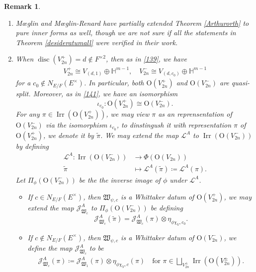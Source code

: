 \documentclass[article]{article}
\numberwithin{equation}{section}
\newtheorem{remark}[theorem]{Remark}
\theoremstyle{definition}
\DeclareMathOperator{\Irr}{Irr}
\DeclareMathOperator{\disc}{disc}
\begin{document}
\begin{remark}
\begin{enumerate}
	\item M\oe glin \cite[\S 1.4 Theorem 1.4.1]{MR2767522} and M\oe glin-Renard \cite{MR3839702} have partially extended Theorem \ref{Arthurorth} to pure inner forms as well, though we are not sure if all the statements in Theorem \ref{desideratumall} were verified in their work.
	\item When $\disc(V_{2n}^+)=d\notin F^{\times 2}$, then as in \ref{139}, we have 
	\begin{align*}
	V_{2n}^+\cong V_{(d,1)}\oplus \mathbb H^{m-1},\quad 
	V_{2n}^-\cong V_{(d,c_0)}\oplus \mathbb H^{m-1} 
	\end{align*} 
	for a $c_0\notin N_{E/F}(E^\times)$. In particular, both $\mathrm O(V_{2n}^+)$ and $\mathrm O(V_{2n}^-)$ are quasi-split. Moreover, as in \ref{141}, we have an isomorphism  $$\iota_{c_0}: \mathrm O(V_{2n}^+)\cong \mathrm O(V_{2n}^{-}).$$
	For any $\pi\in \Irr(\mathrm O(V_{2n}^+))$, we may view $\pi$ as an reprensentation of $\mathrm O(V_{2n}^-)$ via the isomorphism $\iota_{c_0}$, to dinstingush it with representation $\pi$ of $\mathrm O(V_{2n}^+)$, we denote it by $\widetilde{\pi}$. We may extend the map $\mathcal L^A$ to $\Irr\left(\mathrm O(V_{2n}^{-})\right)$ by defining 
	\begin{align*}
	\mathcal L^A: \Irr\left(\mathrm O(V_{2n}^{-})\right)&\longrightarrow \Phi(\mathrm O(V_{2n}))\\
	\widetilde{\pi}&\mapsto\mathcal L^A(\widetilde{\pi})\coloneqq \mathcal L^A(\pi). 
	\end{align*}
	Let $\Pi_{\phi}(\mathrm O(V_{2n}^-))$ be the the inverse image of $\phi$ under $\mathcal L^A$. 
	\begin{itemize}
		\item If $c\in N_{E/F}(E^\times)$, then $\mathfrak W_{\psi,c}$ is a Whittaker datum of $\mathrm O(V_{2n}^+)$, we may extend the map $\mathcal J_{\mathfrak W_{c}}^A$ to $\Pi_{\phi}(\mathrm O(V_{2n}^-))$ be defining 
		$$\mathcal J_{\mathfrak W_{c}}^A(\widetilde{\pi})= \mathcal J_{\mathfrak W_{c}}^A(\pi)\otimes \eta_{\phi\chi_{V},c_0}.$$
		\item If $c\notin N_{E/F}(E^\times)$, then $\mathfrak W_{\psi,c}$ is a Whittaker datum of $\mathrm O(V_{2n}^-)$, we define the map $\mathcal J_{\mathfrak W_{c}}^A$ to be 
		\begin{align*}
		\mathcal J_{\mathfrak W_{c}}^A(\pi)\coloneqq \mathcal J_{\mathfrak W_{1}}^A(\pi)\otimes \eta_{\phi\chi_{V},c}(\pi)\quad \mbox{for}\,\, \pi\in \bigsqcup_{V_{2n}^\pm} \Irr\left(\mathrm O(V_{2n}^{\pm})\right).

\end{align*}
\end{itemize}
\end{enumerate}
\end{remark}
\end{document}
